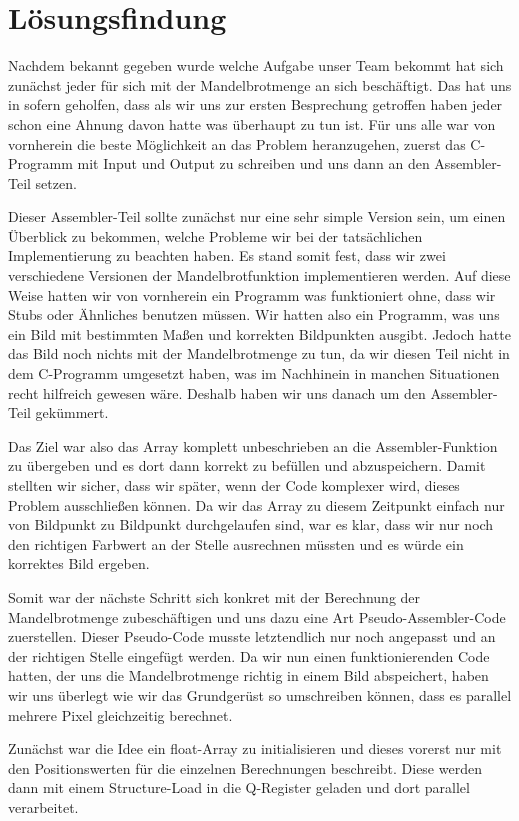 \documentclass[11pt]{scrartcl}
\begin{document}
\section{Lösungsfindung}
Nachdem bekannt gegeben wurde welche Aufgabe unser Team bekommt hat sich zunächst jeder für sich mit der Mandelbrotmenge an sich beschäftigt.
Das hat uns in sofern geholfen, dass als wir uns zur ersten Besprechung getroffen haben jeder schon eine Ahnung davon hatte was überhaupt zu tun ist.
Für uns alle war von vornherein die beste Möglichkeit an das Problem heranzugehen, zuerst das C-Programm mit Input und Output zu schreiben und uns dann an den Assembler-Teil setzen.

Dieser Assembler-Teil sollte zunächst nur eine sehr simple Version sein, um einen Überblick zu bekommen, welche Probleme wir bei der tatsächlichen Implementierung zu beachten haben.
Es stand somit fest, dass wir zwei verschiedene Versionen der Mandelbrotfunktion implementieren werden.
Auf diese Weise hatten wir von vornherein ein Programm was funktioniert ohne, dass wir Stubs oder Ähnliches benutzen müssen.
Wir hatten also ein Programm, was uns ein Bild mit bestimmten Maßen und korrekten Bildpunkten ausgibt.
Jedoch hatte das Bild noch nichts mit der Mandelbrotmenge zu tun, da wir diesen Teil nicht in dem C-Programm umgesetzt haben, was im Nachhinein in manchen Situationen recht hilfreich gewesen wäre.
Deshalb haben wir uns danach um den Assembler-Teil gekümmert.

Das Ziel war also das Array komplett unbeschrieben an die Assembler-Funktion zu übergeben und es dort dann korrekt zu befüllen und abzuspeichern.
Damit stellten wir sicher, dass wir später, wenn der Code komplexer wird, dieses Problem ausschließen können.
Da wir das Array zu diesem Zeitpunkt einfach nur von Bildpunkt zu Bildpunkt durchgelaufen sind, war es klar, dass wir nur noch den richtigen Farbwert an der Stelle ausrechnen müssten und es würde ein korrektes Bild ergeben.

Somit war der nächste Schritt sich konkret mit der Berechnung der Mandelbrotmenge zubeschäftigen und uns dazu eine Art Pseudo-Assembler-Code zuerstellen.
Dieser Pseudo-Code musste letztendlich nur noch angepasst und an der richtigen Stelle eingefügt werden.
Da wir nun einen funktionierenden Code hatten, der uns die Mandelbrotmenge richtig in einem Bild abspeichert, haben wir uns überlegt wie wir das Grundgerüst so umschreiben können, dass es parallel mehrere Pixel gleichzeitig berechnet.

Zunächst war die Idee ein float-Array zu initialisieren und dieses vorerst nur mit den Positionswerten für die einzelnen Berechnungen beschreibt.
Diese werden dann mit einem Structure-Load in die Q-Register geladen und dort parallel verarbeitet.
\end{document}
